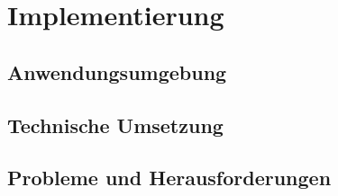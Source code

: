 \chapter{Implementierung}\label{ch:implemntation}

\section{Anwendungsumgebung}\label{sec:implementation_environment}

\section{Technische Umsetzung}\label{sec:implementation_execution}

\section{Probleme und Herausforderungen}\label{sec:implementation_problems}